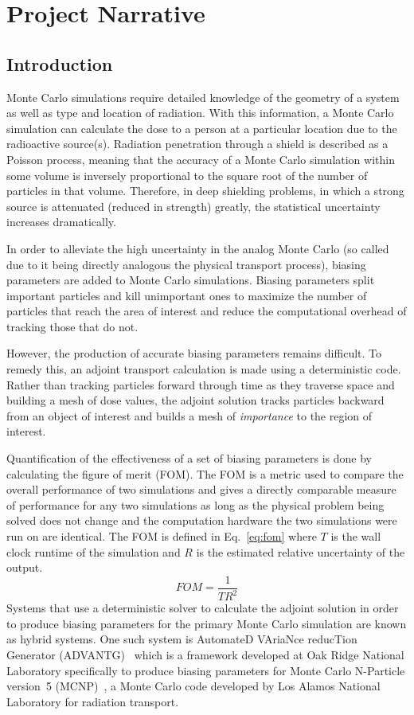 \documentclass{article}
\begin{document}
\section{Project Narrative}\label{sec:b}
\subsection{Introduction}\label{sec:b1}
Monte Carlo simulations require detailed knowledge of the geometry of a system as well as type and location of radiation. With this information, a Monte Carlo simulation can calculate the dose to a person at a particular location due to the radioactive source(s). Radiation penetration through a shield is described as a Poisson process, meaning that the accuracy of a Monte Carlo simulation within some volume is inversely proportional to the square root of the number of particles in that volume. Therefore, in deep shielding problems, in which a strong source is attenuated (reduced in strength) greatly, the statistical uncertainty increases dramatically. 

In order to alleviate the high uncertainty in the analog Monte Carlo (so called due to it being directly analogous the physical transport process), biasing parameters are added to Monte Carlo simulations. Biasing parameters split important particles and kill unimportant ones to maximize the number of particles that reach the area of interest and reduce the computational overhead of tracking those that do not.

However, the production of accurate biasing parameters remains difficult. To remedy this, an adjoint transport calculation is made using a deterministic code. Rather than tracking particles forward through time as they traverse space and building a mesh of dose values, the adjoint solution tracks particles backward from an object of interest and builds a mesh of \textit{importance} to the region of interest.

Quantification of the effectiveness of a set of biasing parameters is done by calculating the figure of merit (FOM). The FOM is a metric used to compare the overall performance of two simulations and gives a directly comparable measure of performance for any two simulations as long as the physical problem being solved does not change and the computation hardware the two simulations were run on are identical. The FOM is defined in Eq.~\ref{eq:fom} where $T$ is the wall clock runtime of the simulation and $R$ is the estimated relative uncertainty of the output.
\begin{equation} \label{eq:fom}
FOM = \frac{1}{T R^2}
\end{equation}
Systems that use a deterministic solver to calculate the adjoint solution in order to produce biasing parameters for the primary Monte Carlo simulation are known as hybrid systems. One such system is AutomateD VAriaNce reducTion Generator (ADVANTG)~\cite{ref:Mosher2015} which is a framework developed at Oak Ridge National Laboratory specifically to produce biasing parameters for Monte Carlo N-Particle version~5 (MCNP)~\cite{ref:X5}, a Monte Carlo code developed by Los Alamos National Laboratory for radiation transport. 
\end{document}
